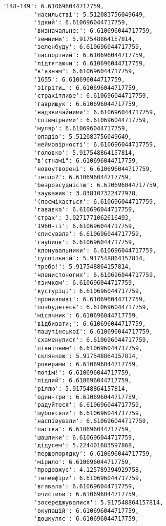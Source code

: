 \documentclass[11pt]{article}
\begin{document}
\begin{Verbatim}[commandchars=\\\{\}]
         '148-149': 6.610696044717759,
         'насильстві': 5.512083756049649,
         'їдкий': 6.610696044717759,
         'визначальне:': 6.610696044717759,
         'земними': 5.917548864157814,
         'зеленбуду': 6.610696044717759,
         'паспортний': 6.610696044717759,
         'підтягаючи': 6.610696044717759,
         "в'язням": 6.610696044717759,
         '1655': 6.610696044717759,
         'зігріти…': 6.610696044717759,
         'страхітливе': 6.610696044717759,
         'гаврищук': 6.610696044717759,
         'надзвичайними': 6.610696044717759,
         'співмірними': 6.610696044717759,
         'муляр': 6.610696044717759,
         'опадів': 5.512083756049649,
         'неймовірності': 6.610696044717759,
         'головко': 5.917548864157814,
         "в'єтнамі": 6.610696044717759,
         'новоутворені': 6.610696044717759,
         'тепло?': 6.610696044717759,
         'безрозсудністю': 6.610696044717759,
         'зауважив': 3.838107322477978,
         '(посміхається': 6.610696044717759,
         'гававка': 6.610696044717759,
         'страх': 3.0271771062616493,
         '1960-ті': 6.610696044717759,
         'списувала': 6.610696044717759,
         'гаубиця': 6.610696044717759,
         'клонувальники': 6.610696044717759,
         'суспільній': 5.917548864157814,
         'треба!': 5.917548864157814,
         'членистоногих': 6.610696044717759,
         'язичком': 6.610696044717759,
         'кустуріці': 6.610696044717759,
         'пронизливі': 6.610696044717759,
         'позбудетесь': 6.610696044717759,
         'місячник': 6.610696044717759,
         'відбивати;': 6.610696044717759,
         'пашутінської': 6.610696044717759,
         'схаменулися': 6.610696044717759,
         'північним': 6.610696044717759,
         'склянкою': 5.917548864157814,
         'роверами': 6.610696044717759,
         'потім!': 6.610696044717759,
         'підлий': 6.610696044717759,
         'ріллю': 5.917548864157814,
         'один-три': 6.610696044717759,
         'радуйтеся': 6.610696044717759,
         'шубовсяли': 6.610696044717759,
         'наспівували': 6.610696044717759,
         'пастка': 6.610696044717759,
         'шашлики': 6.610696044717759,
         'дідусем': 5.224401683597868,
         'першопорядку': 6.610696044717759,
         'мірило': 6.610696044717759,
         'продовжує': 4.125789394929758,
         'телеефіри': 6.610696044717759,
         'вгавала': 6.610696044717759,
         'очистили': 6.610696044717759,
         'зосереджувалися': 5.917548864157814,
         'окупацій': 6.610696044717759,
         'дошкуляє': 6.610696044717759,

\end{Verbatim}
\end{document}
